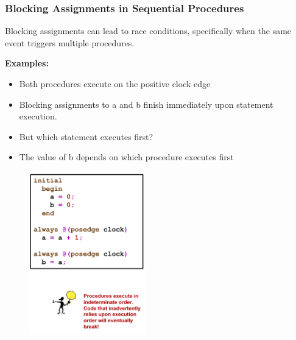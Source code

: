 \documentclass[t, notes, xcolor=table]{beamer}
\begin{document}
\begin{frame}
\frametitle{Blocking Assignments in Sequential Procedures}

\scriptsize{
\begin{multicols}{2}
Blocking assignments can lead to race conditions, specifically when the same event triggers multiple procedures.
\newline


\textbf{Examples:}
\begin{itemize}
\item Both procedures execute on the positive clock edge
\item Blocking assignments to a and b finish immediately upon statement execution.
\item But which statement executes first?
\item The value of b depends on which procedure executes first
\end{itemize}
\vfill
\columnbreak
\begin{figure}
    \includegraphics[width=0.45\textwidth]{img/07_block_seq.png}
\end{figure}
\end{multicols}
}
\end{frame}
\end{document}
